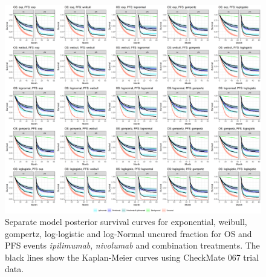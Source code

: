 \documentclass[AMA,STIX1COL]{WileyNJD-v2}
\begin{document}

\begin{figure}
\centering
\includegraphics[width=0.9\linewidth]{plot_S_grid_cf_separate.png}
\caption{\label{fig:S_grid_separate} Separate model posterior survival curves for exponential, weibull, gompertz, log-logistic and log-Normal uncured fraction for OS and PFS events {\it ipilimumab}, {\it nivolumab} and combination treatments. The black lines show the Kaplan-Meier curves using CheckMate 067 trial data.}
\end{figure}

\end{document}
